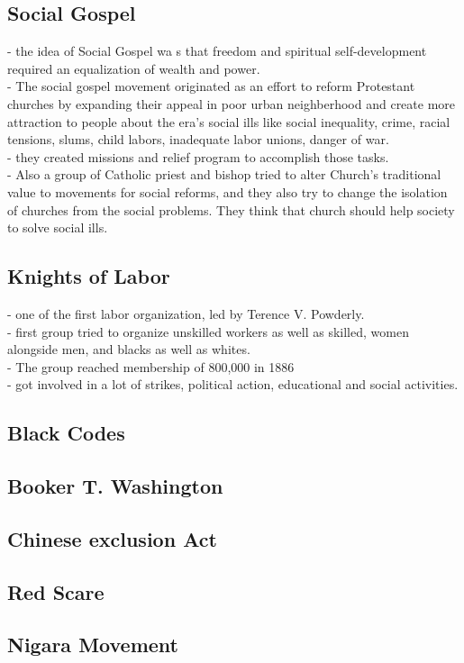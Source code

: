 \documentclass{article}
\begin{document}
\subsection{ Social Gospel}
- the idea of Social Gospel wa s that freedom and spiritual self-development required an equalization of wealth and power.\\
- The social gospel movement originated as an effort to reform Protestant churches by expanding their appeal in poor urban neighberhood and create more attraction to people about the era's social ills like social inequality, crime, racial tensions, slums, child labors, inadequate labor unions, danger of war.\\
- they created missions and relief program to accomplish those tasks.\\
- Also a group of Catholic priest and bishop tried to alter Church's traditional value to movements for social reforms, and they also try to change the isolation of churches from the social problems. They think that church should help society to solve social ills.
\subsection{ Knights of Labor}
- one of the first labor organization, led by Terence V. Powderly.\\
- first group tried to organize unskilled workers as well as skilled, women alongside men, and blacks as well as whites.\\
- The group reached membership of 800,000 in 1886 \\
- got involved in a lot of strikes, political action, educational and social activities.\\
\subsection{ Black Codes}
\subsection{ Booker T. Washington}
\subsection{ Chinese exclusion Act}
\subsection{ Red Scare}
\subsection{ Nigara Movement}
\end{document}
